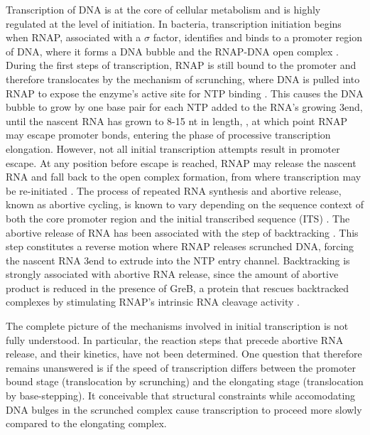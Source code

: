 %
Transcription of DNA is at the core of cellular metabolism and is highly
regulated at the level of initiation. In bacteria, transcription initiation
begins when RNAP, associated with a $\sigma$ factor, identifies and binds to a
promoter region of DNA, where it forms a DNA bubble and the RNAP-DNA open
complex \cite{saecker_mechanism_2011}. During the first steps of
transcription, RNAP is still bound to the promoter and therefore translocates
by the mechanism of scrunching, where DNA is pulled into RNAP to expose the
enzyme's active site for NTP binding \cite{revyakin_abortive_2006,
kapanidis_initial_2006, winkelman_crosslink_2015}. This causes the DNA bubble
to grow by one base pair for each NTP added to the RNA's growing 3\ppp end,
until the nascent RNA has grown to 8-15 nt in length,
\cite{carpousis_cycling_1980, hsu_vitro_2003,tang_real-time_2009,
hsu_initial_2006}, at which point RNAP may escape promoter bonds,
entering the phase of processive transcription elongation. However, not all
initial transcription attempts result in promoter escape. At any position
before escape is reached, RNAP may release the nascent RNA and fall back to
the open complex formation, from where transcription may be re-initiated
\cite{carpousis_cycling_1980}. The process of repeated RNA synthesis and
abortive release, known as abortive cycling, is known to vary depending on the
sequence context of both the core promoter region and the initial transcribed
sequence (ITS) \cite{hsu_initial_2006, hsu_promoter_2002, vo_vitro_2003}. The
abortive release of RNA has been associated with the step of backtracking
\cite{hsu_initial_2006}. This step constitutes a reverse motion where RNAP
releases scrunched DNA, forcing the nascent RNA 3\ppp end to extrude into the
NTP entry channel. Backtracking is strongly associated with abortive RNA
release, since the amount of abortive product is reduced in the presence of
GreB, a protein that rescues backtracked complexes by stimulating RNAP's
intrinsic RNA cleavage activity \cite{hsu_initial_2006, hsu_escherichia_1995,
feng_grea-induced_1994}.

The complete picture of the mechanisms involved in initial transcription is
not fully understood. In particular, the reaction steps that precede abortive
RNA release, and their kinetics, have not been determined. One question that
therefore remains unanswered is if the speed of transcription differs between
the promoter bound stage (translocation by scrunching) and the elongating
stage (translocation by base-stepping). It conceivable that structural
constraints while accomodating DNA bulges in the scrunched complex cause
transcription to proceed more slowly compared to the elongating complex.

